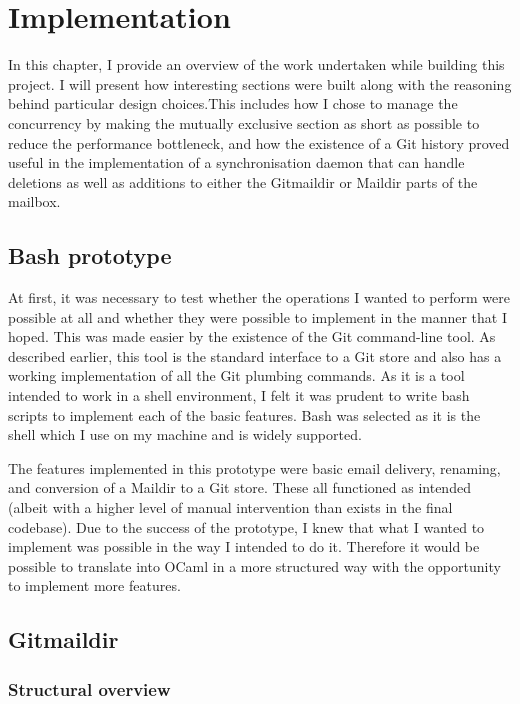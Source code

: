 \chapter{Implementation}

In this chapter, I provide an overview of the work undertaken while building this project. I will present how interesting sections were built along with the reasoning behind particular design choices.This includes how I chose to manage the concurrency by making the mutually exclusive section as short as possible to reduce the performance bottleneck, and how the existence of a Git history proved useful in the implementation of a synchronisation daemon that can handle deletions as well as additions to either the Gitmaildir or Maildir parts of the mailbox.

\section{Bash prototype}

At first, it was necessary to test whether the operations I wanted to perform were possible at all and whether they were possible to implement in the manner that I hoped. This was made easier by the existence of the Git command-line tool. As described earlier, this tool is the standard interface to a Git store and also has a working implementation of all the Git plumbing commands. As it is a tool intended to work in a shell environment, I felt it was prudent to write bash scripts to implement each of the basic features. Bash was selected as it is the shell which I use on my machine and is widely supported.

The features implemented in this prototype were basic email delivery, renaming, and conversion of a Maildir to a Git store. These all functioned as intended (albeit with a higher level of manual intervention than exists in the final codebase). Due to the success of the prototype, I knew that what I wanted to implement was possible in the way I intended to do it. Therefore it would be possible to translate into OCaml in a more structured way with the opportunity to implement more features.

\section{Gitmaildir}

\subsection{Structural overview} \label{section:structuraloverview}

